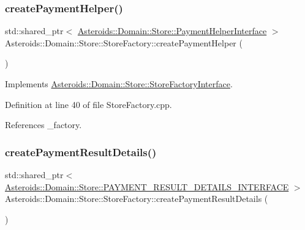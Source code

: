 \subsubsection{\texorpdfstring{create\+Payment\+Helper()}{createPaymentHelper()}}
{\footnotesize\ttfamily std\+::shared\+\_\+ptr$<$ \hyperlink{classAsteroids_1_1Domain_1_1Store_1_1PaymentHelperInterface}{Asteroids\+::\+Domain\+::\+Store\+::\+Payment\+Helper\+Interface} $>$ Asteroids\+::\+Domain\+::\+Store\+::\+Store\+Factory\+::create\+Payment\+Helper (\begin{DoxyParamCaption}{ }\end{DoxyParamCaption})\hspace{0.3cm}{\ttfamily [virtual]}}



Implements \hyperlink{classAsteroids_1_1Domain_1_1Store_1_1StoreFactoryInterface_a6b28cbc40f47112d835d89269de1be40}{Asteroids\+::\+Domain\+::\+Store\+::\+Store\+Factory\+Interface}.



Definition at line 40 of file Store\+Factory.\+cpp.



References \+\_\+factory.

\mbox{\label{classAsteroids_1_1Domain_1_1Store_1_1StoreFactory_a5489405a1a23048570d89de58a456982}} 
\subsubsection{\texorpdfstring{create\+Payment\+Result\+Details()}{createPaymentResultDetails()}}
{\footnotesize\ttfamily std\+::shared\+\_\+ptr$<$ \hyperlink{classAsteroids_1_1Domain_1_1Store_1_1PAYMENT__RESULT__DETAILS__INTERFACE}{Asteroids\+::\+Domain\+::\+Store\+::\+P\+A\+Y\+M\+E\+N\+T\+\_\+\+R\+E\+S\+U\+L\+T\+\_\+\+D\+E\+T\+A\+I\+L\+S\+\_\+\+I\+N\+T\+E\+R\+F\+A\+CE} $>$ Asteroids\+::\+Domain\+::\+Store\+::\+Store\+Factory\+::create\+Payment\+Result\+Details (\begin{DoxyParamCaption}{ }\end{DoxyParamCaption})\hspace{0.3cm}{\ttfamily [virtual]}}



